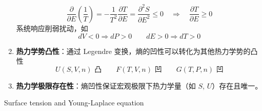 \begin{thm}
\begin{add}
\begin{enumerate}
    \[
    \frac{\partial}{\partial E} \left( \frac{1}{T} \right) = -\frac{1}{T^2} \frac{\partial T}{\partial E} 
    = \frac{\partial^2 S}{\partial E^2} \leq 0 \quad \Rightarrow \quad \frac{\partial T}{\partial E} \geq 0
    \]
    系统响应削弱扰动，如
        \[
          dV < 0 \Rightarrow dP > 0 \qquad dE > 0 \Rightarrow dT > 0
        \]
  \item \textbf{热力学势凸性}：通过 Legendre 变换，熵的凹性可以转化为其他热力学势的凸性
        \[
          U(S,V,n)\text{ 凸}\qquad F(T,V,n)\text{ 凹}\qquad G(T,P,n)\text{ 凹}
        \]
  \item \textbf{热力学极限存在性}：熵凹性保证宏观极限下热力学量（如 $S$, $U$）存在且唯一。
\end{enumerate}
    \end{add}
\end{thm}
\begin{example}
    Surface tension and Young-Laplace equation


\end{example}

